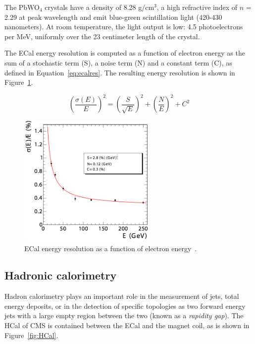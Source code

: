 The PbWO$_4$ crystals have a density of 8.28 g/cm$^{3}$, a high
refractive index of $n$ = 2.29 at peak wavelength and emit blue-green
scintillation light (420-430 nanometers). At room temperature, the
light output is low: 4.5 photoelectrons per MeV, uniformly over the 23
centimeter length of the crystal.

    
The ECal energy resolution is computed as a function of electron
energy as the sum of a stochastic term (S), a noise term (N) and a
constant term (C), as defined in Equation~\ref{eq:ecalres}. The
resulting energy resolution is shown in Figure~\ref{fig:ecalres}.

\begin{equation}
\left(\frac{\sigma(E)}{E}\right)^{2} =
\left(\frac{S}{\sqrt{E}}\right)^{2} + \left(\frac{N}{E}\right)^{2} +
C^{2}
\label{eq:ecalres}
\end{equation}

\begin{figure}[htb]
  \begin{center}
    \includegraphics[width=0.6\textwidth]{Chapters/xLHCMS/resolutionECAL.png}
    \caption{ECal energy resolution as a function of electron energy~\cite{Chatrchyan:2008aa}.}
    \label{fig:ecalres}
  \end{center}
\end{figure}

\subsection{Hadronic calorimetry}
\label{sec:HCAL}
Hadron calorimetry plays an important role in the measurement of jets, total
energy deposits, or in the detection of specific topologies as two
forward energy jets with a large empty region between the two
(known as a \textit{rapidity gap}). The HCal of CMS is contained
between the ECal and the magnet coil, as is shown in
Figure~\ref{fig:HCal}.

